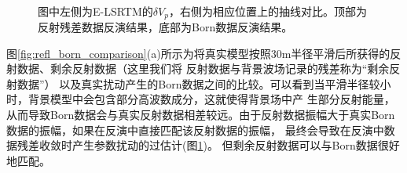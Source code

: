 \begin{figure}[!htb]
   \centering
   \\
   \caption{图中左侧为E-LSRTM的$\delta
	   V_p$，右侧为相应位置上的抽线对比。顶部为反射残差数据反演结果，底部为Born数据反演结果。}
   \label{fig:Vpcomparison}
\end{figure}

图\ref{fig:refl_born_comparison}(a)所示为将真实模型按照30m半径平滑后所获得的反射数据、剩余反射数据（这里我们将
反射数据与背景波场记录的残差称为“剩余反射数据”）
以及真实扰动产生的Born数据之间的比较。可以看到当平滑半径较小时，背景模型中会包含部分高波数成分，这就使得背景场中产
生部分反射能量，从而导致Born数据会与真实反射数据相差较远。由于反射数据振幅大于真实Born数据的振幅，如果在反演中直接匹配该反射数据的振幅，
最终会导致在反演中数据残差收敛时产生参数扰动的过估计(图\ref{fig:Vpcomparison})。
但剩余反射数据可以与Born数据很好地匹配。

